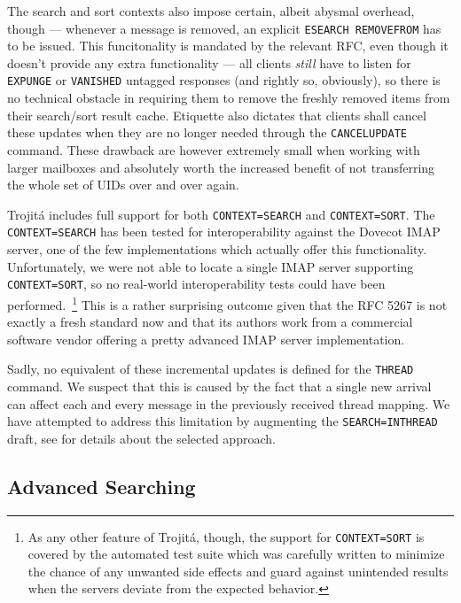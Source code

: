 \documentclass[trojita]{subfiles}
\begin{document}
The search and sort contexts also impose certain, albeit abysmal overhead, though --- whenever a message is removed, an
explicit {\tt ESEARCH REMOVEFROM} has to be issued.  This funcitonality is mandated by the relevant RFC, even though it
doesn't provide any extra functionality --- all clients {\em still} have to listen for {\tt EXPUNGE} or {\tt VANISHED}
untagged responses (and rightly so, obviously), so there is no technical obstacle in requiring them to remove the
freshly removed items from their search/sort result cache.  Etiquette also dictates that clients shall cancel these
updates when they are no longer needed through the {\tt CANCELUPDATE} command.  These drawback are however extremely
small when working with larger mailboxes and absolutely worth the increased benefit of not transferring the whole set of
UIDs over and over again.

Trojitá includes full support for both {\tt CONTEXT=SEARCH} and {\tt CONTEXT=SORT}.  The {\tt CONTEXT=SEARCH} has been
tested for interoperability against the Dovecot IMAP server, one of the few implementations which actually offer this
functionality.  Unfortunately, we were not able to locate a single IMAP server supporting {\tt CONTEXT=SORT}, so no
real-world interoperability tests could have been performed.~\footnote{As any other feature of Trojitá, though, the
support for {\tt CONTEXT=SORT} is covered by the automated test suite which was carefully written to minimize the chance
of any unwanted side effects and guard against unintended results when the servers deviate from the expected behavior.}
This is a rather surprising outcome given that the RFC 5267 is not exactly a fresh standard now and that its authors
work from a commercial software vendor offering a pretty advanced IMAP server implementation.

Sadly, no equivalent of these incremental updates is defined for the {\tt THREAD} command.  We suspect that this is
caused by the fact that a single new arrival can affect each and every message in the previously received thread
mapping.  We have attempted to address this limitation by augmenting the {\tt SEARCH=INTHREAD} draft, see
 for details about the selected approach.

\subsection{Advanced Searching}

\end{document}
